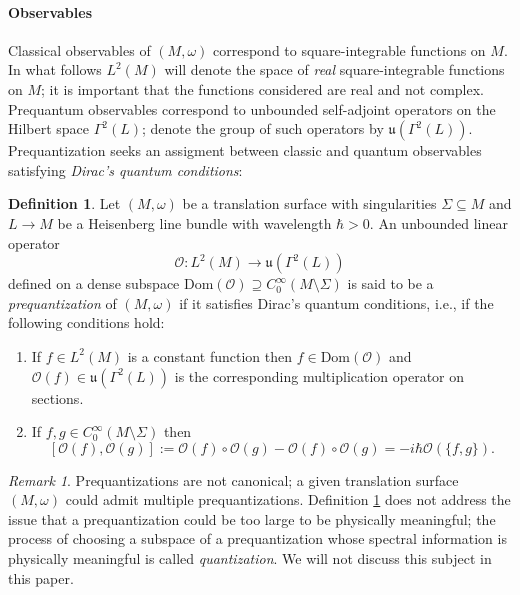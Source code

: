 \documentclass{amsart}
\theoremstyle{definition}
\newtheorem{definition}[theorem]{Definition}
\theoremstyle{remark}
\newtheorem{remark}[theorem]{Remark}
\numberwithin{equation}{section}
\newcommand{\<}{{\langle}}
\renewcommand{\>}{{\rangle}}
\begin{document}
\paragraph*{\bf Observables} Classical observables of $(M,\omega)$ correspond to square-integrable functions on $M$. In what follows $L^2(M)$ will denote the space of \textit{real} square-integrable functions on $M$; it is important that the functions considered are real and not complex. Prequantum observables correspond to unbounded self-adjoint operators on the Hilbert space $\Gamma^2(L)$; denote the group of such operators by $\mathfrak{u}(\Gamma^2(L))$. Prequantization seeks an assigment between classic and quantum observables satisfying \textit{Dirac's quantum conditions}:

\begin{definition}
    \label{def:prequant}
     Let $(M,\omega)$ be a translation surface with singularities $\Sigma \subseteq M$ and $L \to M$ be a Heisenberg line bundle with wavelength $\hbar > 0$. An unbounded linear operator
    \[
    \mathcal{O} \colon L^2(M) \to \mathfrak{u}(\Gamma^2(L))
    \]
    defined on a dense subspace $\mathrm{Dom}(\mathcal{O}) \supseteq C_0^\infty(M \setminus \Sigma)$ is said to be a \textit{prequantization} of $(M,\omega)$ if it satisfies Dirac's quantum conditions, i.e., if the following conditions hold:
    \begin{enumerate}
        \item If $f \in L^2(M)$ is a constant function then $f \in \mathrm{Dom}(\mathcal{O})$ and $\mathcal{O}(f) \in \mathfrak{u}(\Gamma^2(L))$ is the corresponding multiplication operator on sections.
        \item If $f,g \in C_0^\infty(M \setminus \Sigma)$ then
        \[
        [\mathcal{O}(f),\mathcal{O}(g)] := \mathcal{O}(f) \circ\mathcal{O}(g) - \mathcal{O}(f) \circ\mathcal{O}(g) = -i \hbar \mathcal{O}(\{f,g\}).
        \]
    \end{enumerate}
\end{definition}

\begin{remark}
    Prequantizations are not canonical; a given translation surface $(M,\omega)$ could admit multiple prequantizations. Definition \ref{def:prequant} does not address the issue that a prequantization could be too large to be physically meaningful; the process of choosing a subspace of a prequantization whose spectral information is physically meaningful is called \textit{quantization}. We will not discuss this subject in this paper.
\end{remark}
\end{document}
